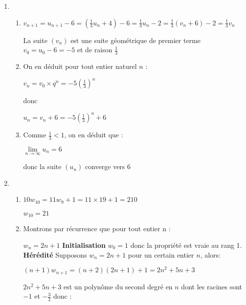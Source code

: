 \begin{corrige}
     \begin{enumerate}
          \item
          \begin{enumerate}[label=\alph*.]
               \item
               $v_{n+1}=u_{n+1}-6=\left(\frac{1}{3}u_{n}+4\right)-6=\frac{1}{3}u_{n}-2=\frac{1}{3}\left(v_{n}+6\right)-2=\frac{1}{3}v_{n}$
               \par
               La suite $\left(v_{n}\right)$ est une suite géométrique de premier terme $v_{0}=u_{0}-6=-5$ et de raison $\frac{1}{3}$
               \item
               On en déduit pour tout entier naturel $n$ :
               \par
               $v_{n}=v_{0}\times q^{n}=-5\left(\frac{1}{3}\right)^{n}$
               \par
               donc
               \par
               $u_{n}=v_{n}+6=-5\left(\frac{1}{3}\right)^{n}+6$
               \item
               Comme $\frac{1}{3} < 1$, on en déduit que :
               \par
               $\lim\limits_{n\rightarrow \infty }u_{n}=6$
               \par
               donc la suite $\left(u_{n}\right)$ converge vers 6
          \end{enumerate}
          \item
          \begin{enumerate}[label=\alph*.]
               \item
               $10w_{10}=11w_{9}+1=11\times 19+1=210$
               \par
               $w_{10}=21$
               \item
               Montrons par récurrence que pour tout entier n :
               \par
               $w_{n}=2n+1$
               \textbf{Initialisation}
               $w_{0}=1$ donc la propriété est vraie au rang 1.
               \textbf{Hérédité}
               Supposons $w_{n}=2n+1$ pour un certain entier $n$, alors:
               \par
               $\left(n+1\right)w_{n+1}=\left(n+2\right)\left(2n+1\right)+1=2n^{2}+5n+3$
               \par
               $2n^{2}+5n+3$ est un polynôme du second degré en $n$ dont les racines sont $-1$ et $-\frac{3}{2}$ donc :

\end{enumerate}
\end{enumerate}
\end{corrige}
